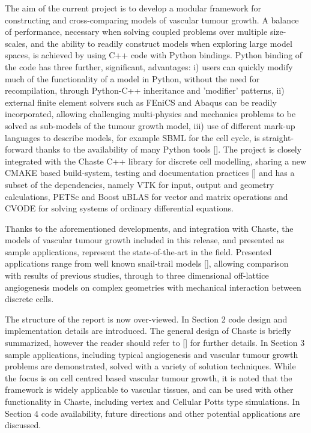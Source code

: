 \documentclass[superscriptaddress, a4paper]{article}
\begin{document}
The aim of the current project is to develop a modular framework for constructing and cross-comparing models of vascular tumour growth. A balance of performance, necessary when solving coupled problems over multiple size-scales, and the ability to readily construct models when exploring large model spaces, is achieved by using C++ code with Python bindings. Python binding of the code has three further, significant, advantages: i) users can quickly modify much of the functionality of a model in Python, without the need for recompilation, through Python-C++ inheritance and 'modifier' patterns, ii) external finite element solvers such as FEniCS and Abaqus can be readily incorporated, allowing challenging multi-physics and mechanics problems to be solved as sub-models of the tumour growth model, iii) use of different mark-up languages to describe models, for example SBML for the cell cycle, is straight-forward thanks to the availability of many Python tools []. The project is closely integrated with the Chaste C++ library for discrete cell modelling, sharing a new CMAKE based build-system, testing and documentation practices [] and has a subset of the dependencies, namely VTK for input, output and geometry calculations, PETSc and Boost uBLAS for vector and matrix operations and CVODE for solving systems of ordinary differential equations.

Thanks to the aforementioned developments, and integration with Chaste, the models of vascular tumour growth included in this release, and presented as sample applications, represent the state-of-the-art in the field. Presented applications range from well known snail-trail models [], allowing comparison with results of previous studies, through to three dimensional off-lattice angiogenesis models on complex geometries with mechanical interaction between discrete cells.

The structure of the report is now over-viewed. In Section 2 code design and implementation details are introduced. The general design of Chaste is briefly summarized, however the reader should refer to [] for further details. In Section 3 sample applications, including typical angiogenesis and vascular tumour growth problems are demonstrated, solved with a variety of solution techniques. While the focus is on cell centred based vascular tumour growth, it is noted that the framework is widely applicable to vascular tissues, and can be used with other functionality in Chaste, including vertex and Cellular Potts type simulations. In Section 4 code availability, future directions and other potential applications are discussed.
\end{document}
